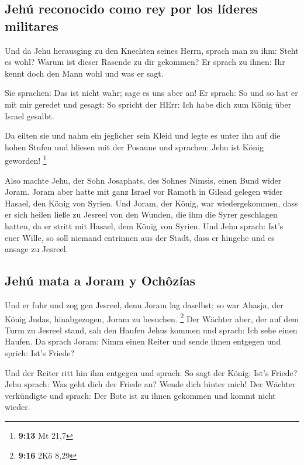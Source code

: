 \hypertarget{jehuxfa-reconocido-como-rey-por-los-luxedderes-militares}{%
\subsection{Jehú reconocido como rey por los líderes
militares}\label{jehuxfa-reconocido-como-rey-por-los-luxedderes-militares}}

 Und da Jehu herausging zu den Knechten seines Herrn,
sprach man zu ihm: Steht es wohl? Warum ist dieser Rasende zu dir
gekommen? Er sprach zu ihnen: Ihr kennt doch den Mann wohl und was er
sagt.

 Sie sprachen: Das ist nicht wahr; sage es uns aber an!
Er sprach: So und so hat er mit mir geredet und gesagt: So spricht der
HErr: Ich habe dich zum König über Israel gesalbt.

 Da eilten sie und nahm ein jeglicher sein Kleid und
legte es unter ihn auf die hohen Stufen und bliesen mit der Posaune und
sprachen: Jehu ist König geworden! \footnote{\textbf{9:13} Mt 21,7}

 Also machte Jehu, der Sohn Josaphats, des Sohnes Nimsis,
einen Bund wider Joram. Joram aber hatte mit ganz Israel vor Ramoth in
Gilead gelegen wider Hasael, den König von Syrien.  Und
Joram, der König, war wiedergekommen, dass er sich heilen ließe zu
Jesreel von den Wunden, die ihm die Syrer geschlagen hatten, da er
stritt mit Hasael, dem König von Syrien. Und Jehu sprach: Ist's euer
Wille, so soll niemand entrinnen aus der Stadt, dass er hingehe und es
ansage zu Jesreel.

\hypertarget{jehuxfa-mata-a-joram-y-ochuxf4zuxedas}{%
\subsection{Jehú mata a Joram y
Ochôzías}\label{jehuxfa-mata-a-joram-y-ochuxf4zuxedas}}

 Und er fuhr und zog gen Jesreel, denn Joram lag
daselbst; so war Ahasja, der König Judas, hinabgezogen, Joram zu
besuchen. \footnote{\textbf{9:16} 2Kö 8,29}  Der Wächter
aber, der auf dem Turm zu Jesreel stand, sah den Haufen Jehus kommen und
sprach: Ich sehe einen Haufen. Da sprach Joram: Nimm einen Reiter und
sende ihnen entgegen und sprich: Ist's Friede?

 Und der Reiter ritt hin ihm entgegen und sprach: So sagt
der König: Ist's Friede? Jehu sprach: Was geht dich der Friede an? Wende
dich hinter mich! Der Wächter verkündigte und sprach: Der Bote ist zu
ihnen gekommen und kommt nicht wieder.


